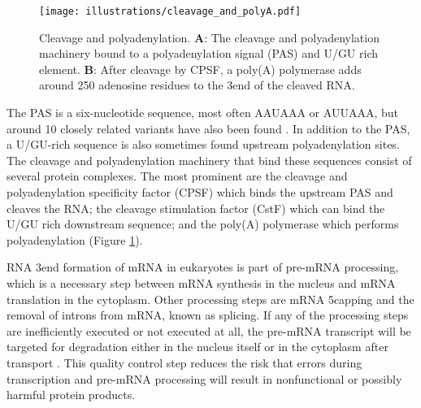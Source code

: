 \begin{figure}[h]
	\begin{center}
		\texttt{[image: illustrations/cleavage\_and\_polyA.pdf]}
	\end{center}
	\caption{Cleavage and polyadenylation. \textbf{A}: The cleavage and
	polyadenylation machinery bound to a polyadenylation signal (PAS) and U/GU
	rich element. \textbf{B}: After cleavage by CPSF, a poly(A) polymerase adds
	around 250 adenosine residues to the 3\protect\ppp end of the cleaved RNA.}
	\label{fig:cleavage}
\end{figure}

The PAS is a six-nucleotide sequence, most often AAUAAA or AUUAAA, but around
10 closely related variants have also been found
\cite{beaudoing_patterns_2000}. In addition to the PAS, a U/GU-rich sequence is
also sometimes found upstream polyadenylation sites. The cleavage and polyadenylation
machinery that bind these sequences consist of several protein complexes. The
most prominent are the cleavage and polyadenylation specificity factor (CPSF)
which binds the upstream PAS and cleaves the RNA; the cleavage stimulation
factor (CstF) which can bind the U/GU rich downstream sequence; and the poly(A)
polymerase which performs polyadenylation \cite{lutz_alternative_2008} (Figure
\ref{fig:cleavage}).

RNA 3\ppp end formation of mRNA in eukaryotes is part of pre-mRNA processing,
which is a necessary step between mRNA synthesis in the nucleus and mRNA
translation in the cytoplasm. Other processing steps are mRNA 5\ppp capping and
the removal of introns from mRNA, known as splicing. If any of the processing
steps are inefficiently executed or not executed at all, the pre-mRNA
transcript will be targeted for degradation either in the nucleus itself or in
the cytoplasm after transport \cite{doma_rna_2007}. This quality control step
reduces the risk that errors during transcription and pre-mRNA processing will
result in nonfunctional or possibly harmful protein products.


